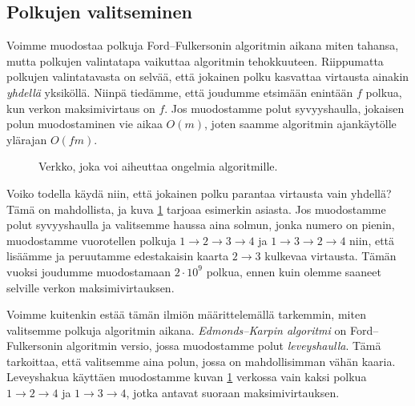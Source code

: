 \subsection{Polkujen valitseminen}

Voimme muodostaa polkuja Ford–Fulkersonin algoritmin aikana miten tahansa,
mutta polkujen valintatapa vaikuttaa algoritmin tehokkuuteen.
Riippumatta polkujen valintatavasta on selvää,
että jokainen polku kasvattaa virtausta ainakin \emph{yhdellä} yksiköllä.
Niinpä tiedämme, että joudumme etsimään enintään $f$ polkua,
kun verkon maksimivirtaus on $f$.
Jos muodostamme polut syvyyshaulla,
jokaisen polun muodostaminen vie aikaa $O(m)$,
joten saamme algoritmin ajankäytölle ylärajan $O(fm)$.

\begin{figure}
\center
\begin{center}
\end{center}
\caption{Verkko, joka voi aiheuttaa ongelmia algoritmille.}
\label{fig:polhuo}
\end{figure}

Voiko todella käydä niin, että jokainen polku parantaa
virtausta vain yhdellä?
Tämä on mahdollista, ja kuva \ref{fig:polhuo} tarjoaa esimerkin asiasta.
Jos muodostamme polut syvyyshaulla ja valitsemme haussa aina solmun,
jonka numero on pienin,
muodostamme vuorotellen polkuja $1 \rightarrow 2 \rightarrow 3 \rightarrow 4$
ja $1 \rightarrow 3 \rightarrow 2 \rightarrow 4$ niin, että
lisäämme ja peruutamme edestakaisin kaarta $2 \rightarrow 3$ kulkevaa virtausta.
Tämän vuoksi joudumme muodostamaan $2 \cdot 10^9$ polkua,
ennen kuin olemme saaneet selville verkon maksimivirtauksen.


Voimme kuitenkin estää tämän ilmiön määrittelemällä tarkemmin,
miten valitsemme polkuja algoritmin aikana.
\emph{Edmonds–Karpin algoritmi} on Ford–Fulkersonin algoritmin versio,
jossa muodostamme polut \emph{leveyshaulla}.
Tämä tarkoittaa, että valitsemme aina
polun, jossa on mahdollisimman vähän kaaria.
Leveyshakua käyttäen muodostamme kuvan \ref{fig:polhuo} verkossa
vain kaksi polkua $1 \rightarrow 2 \rightarrow 4$ ja
$1 \rightarrow 3 \rightarrow 4$, jotka antavat suoraan maksimivirtauksen.

